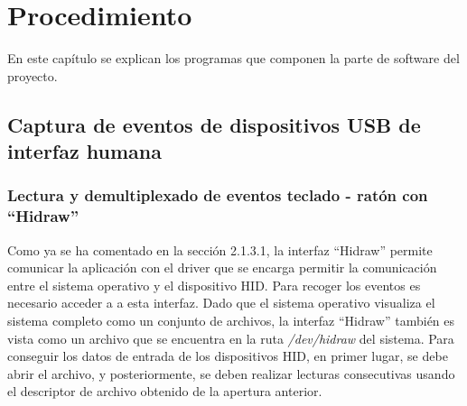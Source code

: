 \chapter{Procedimiento} \label{cap3}

En este capítulo se explican los programas que componen la parte de software del proyecto.

\newpage


\section{Captura de eventos de dispositivos USB de interfaz humana} \label{s3_1}

\subsection{Lectura y demultiplexado de eventos teclado - ratón con ``Hidraw''} \label{s3_1_1}

Como ya se ha comentado en la sección 2.1.3.1, la interfaz ``Hidraw'' permite comunicar la aplicación con el driver que se encarga permitir la comunicación entre el sistema operativo y el dispositivo HID. Para recoger los eventos es necesario acceder a a esta interfaz. Dado que el sistema operativo visualiza el sistema completo como un conjunto de archivos, la interfaz ``Hidraw'' también es vista como un archivo que se encuentra en la ruta {\itshape /dev/hidraw} del sistema. Para conseguir los datos de entrada de los dispositivos HID, en primer lugar, se debe abrir el archivo, y posteriormente, se deben realizar lecturas consecutivas usando el descriptor de archivo obtenido de la apertura anterior. 

